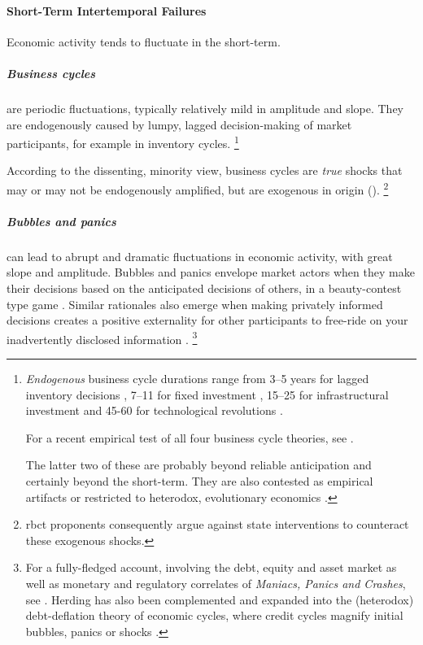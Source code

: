 \paragraph{Short-Term Intertemporal Failures}
	\label{sec:short-term-inconsistency}
Economic activity tends to fluctuate in the short-term.

\subparagraph{Business cycles} are periodic fluctuations, typically relatively mild in amplitude and slope.
They are endogenously caused by lumpy, lagged decision-making of market participants, for example in inventory cycles.
\footnote{
	\emph{Endogenous} business cycle durations range from 3--5 years for lagged inventory decisions \citep{Kitchin1923}, 7--11 for fixed investment \citep{Juglar1862}, 15--25 for infrastructural investment \citep{Kuznets1930} and 45-60 for technological revolutions \citep{Kondratiev1925}.

	For a recent empirical test of all four business cycle theories, see \cite{Korotayev2010}.

	The latter two of these are probably beyond reliable anticipation and certainly beyond the short-term.
	They are also contested as empirical artifacts \citep{Howrey1968} or restricted to heterodox, evolutionary economics \citep{Modelski2010}.
}

According to the dissenting, minority view, business cycles are \emph{true} shocks that may or may not be endogenously amplified, but are exogenous in origin (\citealt{Kydland1982}).
\footnote{
	\gls{rbct} proponents consequently argue against state interventions to counteract these exogenous shocks.
}

\subparagraph{Bubbles and panics}
can lead to abrupt and dramatic fluctuations in economic activity, with great slope and amplitude.
Bubbles and panics envelope market actors when they make their decisions based on the anticipated decisions of others, in a beauty-contest type game \citep{Keynes1936}.
Similar rationales also emerge when making privately informed decisions creates a positive externality for other participants to free-ride on your inadvertently disclosed information \citep{Banerjee-1992-aa}.
\footnote{
	For a fully-fledged account, involving the debt, equity and asset market as well as monetary and regulatory correlates of \emph{Maniacs, Panics and Crashes}, see \cite{KindlebergerAliber-2005-aa}.
	Herding has also been complemented and expanded into the (heterodox) debt-deflation theory of economic cycles, where credit cycles magnify initial bubbles, panics or shocks \citep{Fisher1933}.
}

